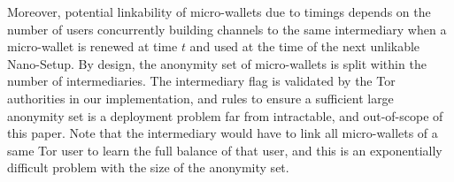 Moreover, potential linkability of micro-wallets due to timings 
depends on the number of users concurrently building channels to the 
same intermediary when a micro-wallet is renewed at time $t$ and 
used at the time of the next unlikable Nano-Setup. By design, 
the anonymity set of micro-wallets is split within the number of 
intermediaries. The intermediary flag is validated by the Tor 
authorities in our implementation, and rules to ensure a sufficient 
large anonymity set is a deployment problem far from intractable, 
and out-of-scope of this paper. Note that the intermediary would 
have to link all micro-wallets of a same Tor user to learn the full 
balance of that user, and this is an exponentially difficult problem 
with the size of the anonymity set. 

%
%
% 
%

